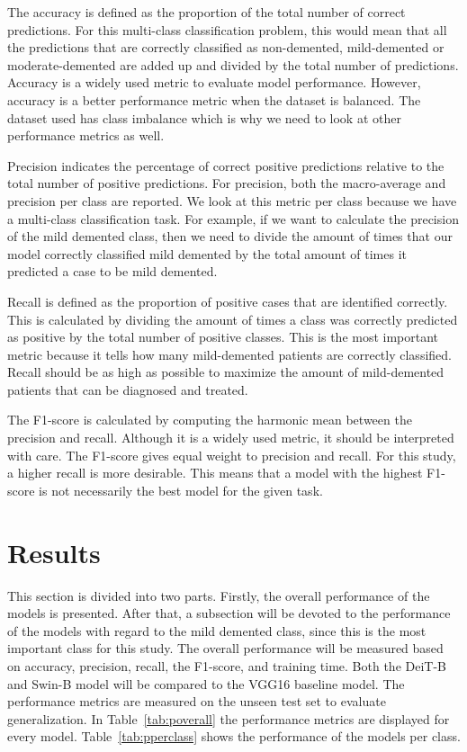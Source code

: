\documentclass[11pt, a4paper]{article}
\begin{document}
The accuracy is defined as the proportion of the total number of correct predictions. For this multi-class classification problem, this would mean that all the predictions that are correctly classified as non-demented, mild-demented or moderate-demented are added up and divided by the total number of predictions. Accuracy is a widely used metric to evaluate model performance. However, accuracy is a better performance metric when the dataset is balanced. The dataset used has class imbalance which is why we need to look at other performance metrics as well.

Precision indicates the percentage of correct positive predictions relative to the total number of positive predictions. For precision, both the macro-average and precision per class are reported. We look at this metric per class because we have a multi-class classification task. For example, if we want to calculate the precision of the mild demented class, then we need to divide the amount of times that our model correctly classified mild demented by the total amount of times it predicted a case to be mild demented. 

Recall is defined as the proportion of positive cases that are identified correctly. This is calculated by dividing the amount of times a class was correctly predicted as positive by the total number of positive classes. This is the most important metric because it tells how many mild-demented patients are correctly classified. Recall should be as high as possible to maximize the amount of mild-demented patients that can be diagnosed and treated.

The F1-score is calculated by computing the harmonic mean between the precision and recall. Although it is a widely used metric, it should be interpreted with care. The F1-score gives equal weight to precision and recall. For this study, a higher recall is more desirable. This means that a model with the highest F1-score is not necessarily the best model for the given task. 



\newpage


\section{Results}
This section is divided into two parts. Firstly, the overall performance of the models is presented. After that, a subsection will be devoted to the performance of the models with regard to the mild demented class, since this is the most important class for this study. The overall performance will be measured based on accuracy, precision, recall, the F1-score, and training time. Both the DeiT-B and Swin-B model will be compared to the VGG16 baseline model. The performance metrics are measured on the unseen test set to evaluate generalization. In Table~\ref{tab:poverall} the performance metrics are displayed for every model. Table~\ref{tab:pperclass} shows the performance of the models per class.
\end{document}
